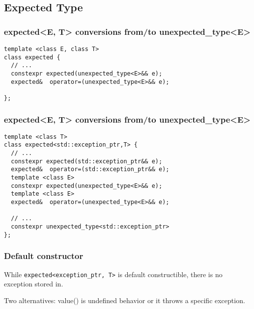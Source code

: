 \documentclass[xcolor=dvipsnames]{beamer}
\newcommand{\cpp}[1]{\lstinline{#1}}
\begin{document}
\subsection{Expected Type}

\begin{frame}[fragile]
\frametitle{expected<E, T> conversions from/to unexpected\_type<E>}


\begin{lstlisting}
template <class E, class T>
class expected {
  // ...
  constexpr expected(unexpected_type<E>&& e);
  expected&  operator=(unexpected_type<E>&& e);
  
};
\end{lstlisting}

\end{frame}

\begin{frame}[fragile]
\frametitle{expected<E, T> conversions from/to unexpected\_type<E>}

\begin{lstlisting}
template <class T>
class expected<std::exception_ptr,T> {
  // ...
  constexpr expected(std::exception_ptr&& e);
  expected&  operator=(std::exception_ptr&& e);
  template <class E>
  constexpr expected(unexpected_type<E>&& e);
  template <class E>
  expected&  operator=(unexpected_type<E>&& e);

  // ...  
  constexpr unexpected_type<std::exception_ptr> 
};
\end{lstlisting}

\end{frame}
\begin{frame}[fragile]
\frametitle{Default constructor}
While \cpp{expected<exception_ptr, T>} is default constructible, there is no exception stored in.

Two alternatives: value() is undefined behavior or it throws a specific exception.

\end{frame}
\end{document}
